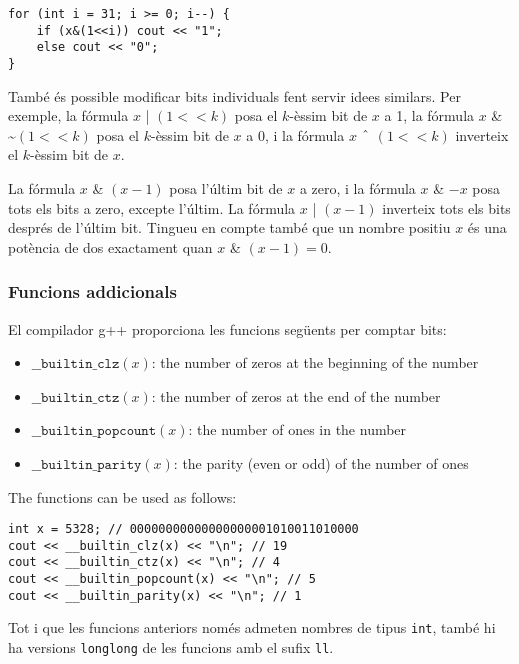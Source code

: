 \begin{lstlisting}
for (int i = 31; i >= 0; i--) {
    if (x&(1<<i)) cout << "1";
    else cout << "0";
}
\end{lstlisting}


També és possible modificar bits individuals fent servir idees
similars. Per exemple, la fórmula $x$ | $(1 < < k)$ posa el $k$-èssim
bit de $x$ a 1, la fórmula $x$ \& \textasciitilde $(1 < < k)$ posa el
$k$-èssim bit de $x$ a 0, i la fórmula $x$ $\XOR$ $(1 < < k)$
inverteix el $k$-èssim bit de $x$.

La fórmula $x$ \& $(x-1)$ posa l'últim bit de $x$ a zero, i la fórmula
$x$ \& $-x$ posa tots els bits a zero, excepte l'últim. La
fórmula $x$ | $(x-1)$ inverteix tots els bits després de l'últim
bit. Tingueu en compte també que un nombre positiu $x$ és una potència
de dos exactament quan $x$ \& $(x-1) = 0$.

\subsubsection*{Funcions addicionals}

El compilador g++ proporciona les funcions següents per comptar bits:


\begin{itemize}
\item
$\texttt{\_\_builtin\_clz}(x)$:
the number of zeros at the beginning of the number
\item
$\texttt{\_\_builtin\_ctz}(x)$:
the number of zeros at the end of the number
\item
$\texttt{\_\_builtin\_popcount}(x)$:
the number of ones in the number
\item
$\texttt{\_\_builtin\_parity}(x)$:
the parity (even or odd) of the number of ones
\end{itemize}

\begin{samepage}

The functions can be used as follows:
\begin{lstlisting}
int x = 5328; // 00000000000000000001010011010000
cout << __builtin_clz(x) << "\n"; // 19
cout << __builtin_ctz(x) << "\n"; // 4
cout << __builtin_popcount(x) << "\n"; // 5
cout << __builtin_parity(x) << "\n"; // 1
\end{lstlisting}
\end{samepage}


Tot i que les funcions anteriors només admeten nombres de tipus
\texttt{int}, també hi ha versions \texttt{longlong} de les funcions
amb el sufix \texttt{ll}.

